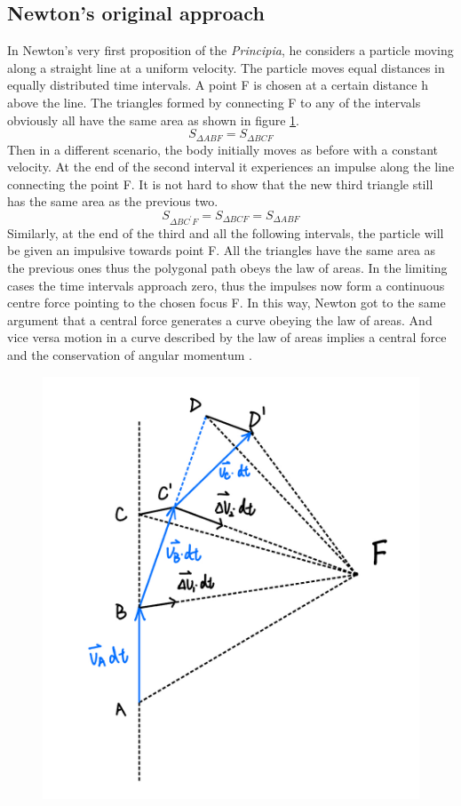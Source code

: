 \documentclass{article}
\begin{document}
\subsection{Newton's original approach}

In Newton's very first proposition of the \textit{Principia}, he considers a particle moving along a straight line at a uniform velocity. The particle moves equal distances in equally distributed time intervals. A point F is chosen at a certain distance h above the line. The triangles formed by connecting F to any of the intervals obviously all have the same area as shown in figure \ref{fig:polygon}.
\[S_{\Delta ABF} = S_{\Delta BCF}\]
Then in a different scenario, the body initially moves as before with a constant velocity. At the end of the second interval it experiences an impulse along the line connecting the point F. It is not hard to show that the new third triangle still has the same area as the previous two.
\[S_{\Delta BC^{\prime} F} = S_{\Delta BCF} = S_{\Delta ABF}\]
Similarly, at the end of the third and all the following intervals, the particle will be given an impulsive towards point F. All the triangles have the same area as the previous ones thus the polygonal path obeys the law of areas. In the limiting cases the  time intervals approach zero, thus the impulses now form a continuous centre force pointing to the chosen focus F. In this way, Newton got to the same argument that a central force generates a curve obeying the law of areas. And vice versa motion in a curve described by the law of areas implies a central force and the conservation of angular momentum \autocite{Cohen1981}.

\begin{figure}[ht]
    \centering
    \includegraphics[width=0.5\linewidth]{images/IMG_6728.PNG}
    \label{fig:polygon}
\end{figure}
\end{document}
